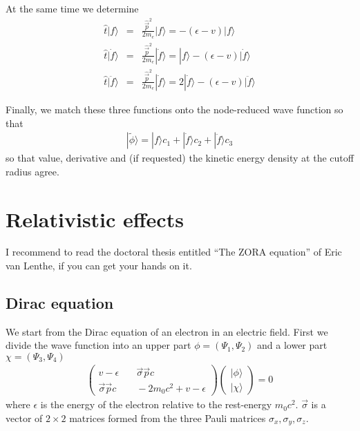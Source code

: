 \documentclass[11pt,a4paper]{report}
\begin{document}
At the same time we determine 
\begin{eqnarray}
\hat{t}|f\rangle&=&\frac{\hat{\vec{p}}^2}{2m_e}|f\rangle
=-(\epsilon-v)|f\rangle
\nonumber\\
\hat{t}|\dot{f}\rangle&=&\frac{\hat{\vec{p}}^2}{2m_e}|\dot{f}\rangle
=|f\rangle-(\epsilon-v)|\dot{f}\rangle
\nonumber\\
\hat{t}|\ddot{f}\rangle&=&\frac{\hat{\vec{p}}^2}{2m_e}|\dot{f}\rangle
=2|\dot{f}\rangle-(\epsilon-v)|\ddot{f}\rangle
\end{eqnarray}

Finally, we match these three functions onto the node-reduced wave
function so that
\begin{eqnarray}
|\tilde{\phi}\rangle=|f\rangle c_1 
+|\dot{f}\rangle c_2+|\ddot{f}\rangle c_3
\end{eqnarray}
so that value, derivative and (if requested) the kinetic energy
density at the cutoff radius agree.

\section{Relativistic effects}
I recommend to read the doctoral thesis entitled ``The ZORA equation''
of Eric van Lenthe\cite{lenthe96_thesis}, if you can get your hands on
it.


\subsection{Dirac equation}
We start from the Dirac equation of an electron in an electric field.
First we divide the wave function into an upper part
$\phi=(\Psi_1,\Psi_2)$ and a lower part $\chi=(\Psi_3,\Psi_4)$
\begin{eqnarray}
\left(\begin{array}{cc}
v-\epsilon &\quad \vec{\sigma}\vec{p}c\\
\vec{\sigma}\vec{p}c &\quad -2m_0c^2+v-\epsilon\end{array}\right)
\left(\begin{array}{c}|\phi\rangle\\|\chi\rangle\end{array}\right)=0
\label{eq:dirac2by2withepsilon}
\end{eqnarray}
where $\epsilon$ is the energy of the electron relative to the
rest-energy $m_0c^2$. $\vec{\sigma}$ is a vector of $2\times2$
matrices formed from the three Pauli matrices
$\sigma_x,\sigma_y,\sigma_z$.
\end{document}
